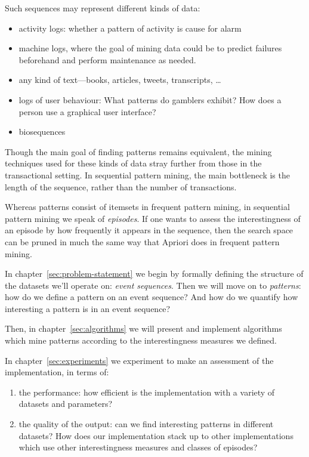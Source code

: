 Such sequences may represent different kinds of data:
\begin{itemize}
\item activity logs: whether a pattern of activity is cause for alarm
\item machine logs, where the goal of mining data could be to predict failures beforehand and perform maintenance as needed.
\item any kind of text---books, articles, tweets, transcripts, \ldots
\item logs of user behaviour: What patterns do gamblers exhibit? How does a person use a graphical user interface?
\item biosequences \cite{biosequences}
\end{itemize}

Though the main goal of finding patterns remains equivalent, the mining techniques used for these kinds of data stray further from those in the transactional setting. In sequential pattern mining, the main bottleneck is the length of the sequence, rather than the number of transactions.

Whereas patterns consist of itemsets in frequent pattern mining, in sequential pattern mining we speak of \emph{episodes}. If one wants to assess the interestingness of an episode by how frequently it appears in the sequence, then the search space can be pruned in much the same way that Apriori does in frequent pattern mining.

In chapter~\ref{sec:problem-statement} we begin by formally defining the structure of the datasets we'll operate on: \emph{event sequences}. Then we will move on to \emph{patterns}: how do we define a pattern on an event sequence?
And how do we quantify how interesting a pattern is in an event sequence?

Then, in chapter~\ref{sec:algorithms} we will present and implement algorithms which mine patterns according to the interestingness measures we defined.

In chapter~\ref{sec:experiments} we experiment to make an assessment of the implementation, in terms of:

\begin{enumerate}
\item the performance: how efficient is the implementation with a variety of datasets and parameters?
\item the quality of the output: can we find interesting patterns in different datasets? How does our implementation stack up to other implementations which use other interestingness measures and classes of episodes?
\end{enumerate}

